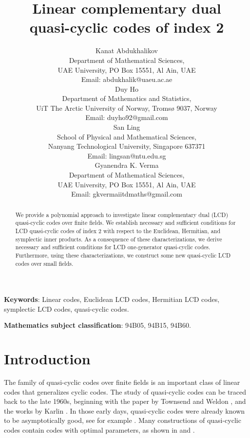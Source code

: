 \documentclass[a4paper,12pt]{article}
\title{Linear complementary dual \\quasi-cyclic codes of index 2}
\author{Kanat Abdukhalikov \\	
Department of Mathematical Sciences, \\
UAE University, PO Box 15551, Al Ain, UAE\\
Email: abdukhalik@uaeu.ac.ae \bigskip  \\  
Duy Ho \\
Department of Mathematics and Statistics, \\
UiT The Arctic University of Norway, Tromsø
9037, Norway\\
Email: duyho92@gmail.com \bigskip \\
San Ling \\	
School of Physical and Mathematical Sciences, \\
Nanyang Technological University, Singapore 637371\\ 
 Email: lingsan@ntu.edu.sg\bigskip  \\ 
Gyanendra K. Verma \\	
Department of Mathematical Sciences, \\
UAE University, PO Box 15551, Al Ain, UAE\\
Email:  gkvermaiitdmaths@gmail.com}
\date{ }
\begin{document}
 

\maketitle

\theoremstyle{plain} 
\newtheorem{lemma}{Lemma}[section] 
\newtheorem{theorem}[lemma]{Theorem}
\newtheorem{corollary}[lemma]{Corollary}
\newtheorem{proposition}[lemma]{Proposition}


\theoremstyle{definition}
\newtheorem{definition}{Definition}[section] 
\newtheorem{remark}{Remark}
\newtheorem{example}{Example}



\newcommand{\eps}{\varepsilon}
\newcommand{\inprod}[1]{\left\langle #1 \right\rangle}
\newcommand{\la}{\lambda} 
\newcommand{\al}{\alpha}
\newcommand{\om}{\omega} 
\newcommand{\gam}{\gamma}
\newcommand{\be}{\beta}
\newcommand{\sig}{\sigma}







\begin{abstract} 
We provide a polynomial approach to investigate linear complementary dual (LCD) quasi-cyclic codes over finite fields. We establish necessary and sufficient conditions for  LCD quasi-cyclic codes of index 2 with respect to the Euclidean, Hermitian, and symplectic inner products.  As a consequence of these characterizations, we derive necessary and sufficient conditions for LCD one-generator quasi-cyclic codes. Furthermore, using these characterizations, we construct some new quasi-cyclic LCD codes over small fields.
\end{abstract}

\textbf{Keywords}:  Linear codes,  Euclidean LCD codes,  Hermitian LCD codes,  symplectic LCD codes, quasi-cyclic codes.

\textbf{Mathematics subject classification}: 94B05, 94B15, 94B60.

\section{Introduction}


The family of quasi-cyclic codes over finite fields is an important class of linear codes that generalizes cyclic codes. The study of quasi-cyclic codes can be traced back to the late 1960s, beginning with the paper by  Townsend and Weldon \cite{townsend1967}, and the works by Karlin \cite{karlin1969, karlin1970}.
In those early days, quasi-cyclic codes were already known to be asymptotically good, see for example \cite{chen1969}.
Many constructions of quasi-cyclic codes contain codes with optimal parameters, as shown in \cite{grassltable} and \cite{gulliver1991}. 
\end{document}
